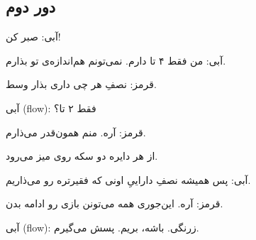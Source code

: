 
\subsection{دور دوم}\label{round2}

آبی: صبر کن!

آبی: من فقط ۴ تا دارم.
نمی‌تونم هم‌اندازه‌ی تو بذارم.

قرمز: نصفِ هر چی داری بذار وسط.

آبی (flow): فقط ۲ تا؟

قرمز: آره. منم همون‌قدر می‌ذارم.

از هر دایره دو سکه روی میز می‌رود.

آبی: پس همیشه نصفِ
داراییِ اونی که فقیرتره رو می‌ذاریم.

قرمز: آره. این‌جوری همه می‌تونن بازی رو ادامه بدن.

آبی (flow): زرنگی.
باشه، بریم.
پسش می‌گیرم.

